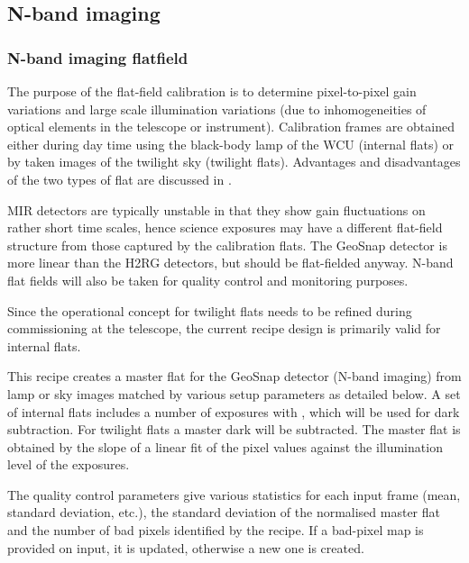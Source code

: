 
\subsection{N-band imaging}
\label{ssec:recipes_img_n}

\subsubsection{N-band imaging flatfield}
\label{n_img_flatfield}
\label{rec:n_img_flatfield}
\label{sssec:n_img_flatfield}
\label{n_img_flat}
\label{rec:n_img_flat}
\label{sssec:n_img_flat}
\label{metis_n_img_flat}
\label{rec:metis_n_img_flat}
\label{sssec:metis_n_img_flat}

The purpose of the flat-field calibration is to determine
pixel-to-pixel gain variations and large scale illumination variations
(due to inhomogeneities of optical elements in the telescope or
instrument). Calibration frames are obtained either during day time
using the black-body lamp of the \ac{WCU} (internal flats) or by taken
images of the twilight sky (twilight flats). Advantages and
disadvantages of the two types of flat are discussed in
\cite{METIS-calibration_plan}.

MIR detectors are typically unstable in that they show gain
fluctuations on rather short time scales, hence science exposures may
have a different flat-field structure from those captured by the
calibration flats.  The GeoSnap detector is more linear
than the H2RG detectors, but should be flat-fielded anyway.
N-band flat fields will also be taken for quality control and monitoring purposes.

Since the operational concept for twilight flats needs to be refined
during commissioning at the telescope, the current recipe design is
primarily valid for internal flats.

This recipe creates a master flat for the GeoSnap detector (N-band
imaging) from lamp or sky images matched by various setup parameters
as detailed below.  A set of internal flats includes a number of
exposures with , which will be used for dark
subtraction. For twilight flats a master dark will be subtracted. The
master flat is obtained by the slope of a linear fit of the pixel
values against the illumination level of the exposures.

The quality control parameters give various statistics for each input
frame (mean, standard deviation, etc.), the standard deviation of the
normalised master flat and the number of bad pixels identified by the
recipe. If a bad-pixel map is provided on input, it is updated,
otherwise a new one is created.

